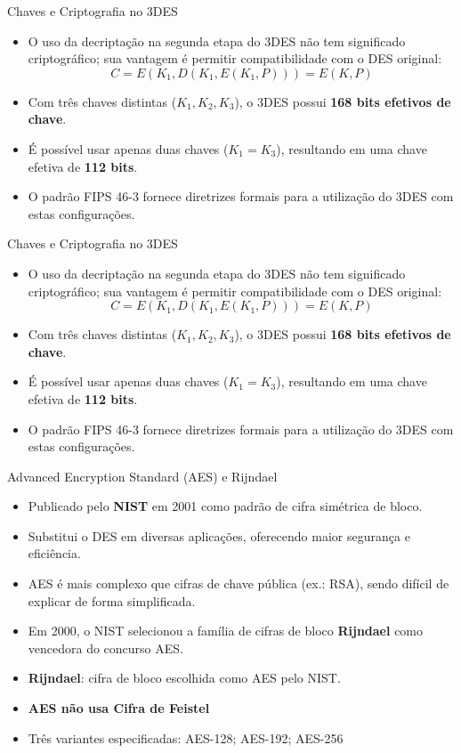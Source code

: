 \begin{frame}{Chaves e Criptografia no 3DES}
    \begin{itemize}
        \item O uso da decriptação na segunda etapa do 3DES não tem significado criptográfico;  
              sua vantagem é permitir compatibilidade com o DES original:
        \[
            C = E(K_1, D(K_1, E(K_1, P))) = E(K, P)
        \]
        \item Com três chaves distintas ($K_1, K_2, K_3$), o 3DES possui \textbf{168 bits efetivos de chave}.
        \item É possível usar apenas duas chaves ($K_1 = K_3$), resultando em uma chave efetiva de \textbf{112 bits}.
        \item O padrão FIPS 46-3 fornece diretrizes formais para a utilização do 3DES com estas configurações.
    \end{itemize}
\end{frame}

\begin{frame}{Chaves e Criptografia no 3DES}
    \begin{itemize}
        \item O uso da decriptação na segunda etapa do 3DES não tem significado criptográfico;  
              sua vantagem é permitir compatibilidade com o DES original:
        \[
            C = E(K_1, D(K_1, E(K_1, P))) = E(K, P)
        \]
        \item Com três chaves distintas ($K_1, K_2, K_3$), o 3DES possui \textbf{168 bits efetivos de chave}.
        \item É possível usar apenas duas chaves ($K_1 = K_3$), resultando em uma chave efetiva de \textbf{112 bits}.
        \item O padrão FIPS 46-3 fornece diretrizes formais para a utilização do 3DES com estas configurações.
    \end{itemize}
\end{frame}

\begin{frame}{Advanced Encryption Standard (AES) e Rijndael}
    \begin{itemize}
        \item Publicado pelo \textbf{NIST} em 2001 como padrão de cifra simétrica de bloco.
        \item Substitui o DES em diversas aplicações, oferecendo maior segurança e eficiência.
        \item AES é mais complexo que cifras de chave pública (ex.: RSA), sendo difícil de explicar de forma simplificada.
        \item Em 2000, o NIST selecionou a família de cifras de bloco \textbf{Rijndael} como vencedora do concurso AES.
                \item \textbf{Rijndael}: cifra de bloco escolhida como AES pelo NIST. 
                \item \textbf{AES não usa Cifra de Feistel}
 
               \item Três variantes especificadas: AES-128; AES-192; AES-256
    \end{itemize}
\end{frame}

